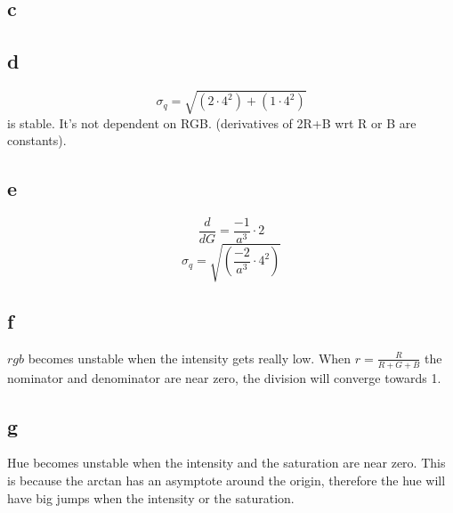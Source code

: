 \documentclass[a4paper,11pt]{article}
\begin{document}
	\subsection*{c}

	\subsection*{d}
	\[\sigma_q = \sqrt{(2\cdot4^2)+(1\cdot4^2)}\] 
	is stable. It's not dependent on RGB. (derivatives of 2R+B wrt R or B are constants).
	\subsection*{e}
	\[\frac{d}{dG}=\frac{-1}{a^3}\cdot 2\]
	\[\sigma_q = \sqrt{(\frac{-2}{a^3}\cdot4^2)}\] 	
	\subsection*{f}
		$rgb$ becomes unstable when the intensity gets really low. When $r=\frac{R}{R+G+B}$ the nominator and denominator are near zero, the division will converge towards 1.
	\subsection*{g}
		Hue becomes unstable when the intensity and the saturation are near zero. This is because the arctan has an asymptote around the origin, therefore the hue will have big jumps when the intensity or the saturation.
\end{document}
